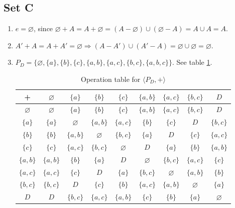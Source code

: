 \documentclass{article}
\let\emptyset\varnothing
\begin{document}
\subsection{Set C}
\begin{enumerate}
    \item $e = \emptyset$, since $\emptyset + A = A + \emptyset = (A - \emptyset) \cup (\emptyset - A) = A \cup A = A$.
    \item $A' + A = A + A' = \emptyset \Rightarrow (A - A') \cup (A'- A) = \emptyset \cup \emptyset = \emptyset$.
    \item $P_D = \{\emptyset, \{a\}, \{b\}, \{c\}, \{a, b\}, \{a, c\}, \{b, c\}, \{a, b, c\}\}$. See table \ref{tab:powerset-op}.
    \begin{table}[!ht]
        \centering
        \begin{tabular}{c|cccccccc}
        +             & $\emptyset$   & $\{a\}$       & $\{b\}$       & $\{c\}$       & $\{a, b\}$    & $\{a, c\}$    & $\{b, c\}$    & $D$ \\
        \hline
        $\emptyset$   & $\emptyset$   & $\{a\}$       & $\{b\}$       & $\{c\}$       & $\{a, b\}$    & $\{a, c\}$    & $\{b, c\}$    & $D$ \\
        $\{a\}$       & $\{a\}$       & $\emptyset$   & $\{a, b\}$    & $\{a, c\}$    & $\{b\}$       & $\{c\}$       & $D$           & $\{b, c\}$    \\
        $\{b\}$       & $\{b\}$       & $\{a, b\}$    & $\emptyset$   & $\{b, c\}$    & $\{a\}$       & $D$           & $\{c\}$       & $\{a, c\}$    \\
        $\{c\}$       & $\{c\}$       & $\{a, c\}$    & $\{b, c\}$    & $\emptyset$   & $D$           & $\{a\}$       & $\{b\}$       & $\{a, b\}$    \\
        $\{a, b\}$    & $\{a, b\}$    & $\{b\}$       & $\{a\}$       & $D$           & $\emptyset$   & $\{b, c\}$    & $\{a, c\}$    & $\{c\}$       \\
        $\{a, c\}$    & $\{a, c\}$    & $\{c\}$       & $D$           & $\{a\}$       & $\{b, c\}$    & $\emptyset$   & $\{a, b\}$    & $\{b\}$       \\
        $\{b, c\}$    & $\{b, c\}$    & $D$           & $\{c\}$       & $\{b\}$       & $\{a, c\}$    & $\{a, b\}$    & $\emptyset$   & $\{a\}$       \\
        $D$           & $D$           & $\{b, c\}$    & $\{a, c\}$    & $\{a, b\}$    & $\{c\}$       & $\{b\}$       & $\{a\}$       & $\emptyset$  
        \end{tabular}
        \caption{Operation table for $\langle P_D, + \rangle$}
        \label{tab:powerset-op}
    \end{table}
\end{enumerate}
\end{document}
